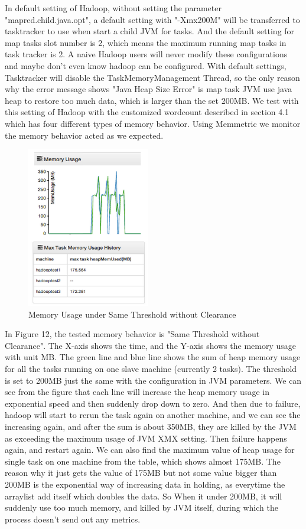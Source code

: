 In default setting of Hadoop, without setting the parameter "mapred.child.java.opt", a default setting with "-Xmx200M" will be transferred to tasktracker to use when start a child JVM for tasks. And the default setting for map tasks slot number is 2, which means the maximum running map tasks in task tracker is 2. A naive Hadoop users will never modify these configurations and maybe don't even know hadoop can be configured.
With default settings, Tasktracker will disable the TaskMemoryManagement Thread, so the only reason why the error message shows "Java Heap Size Error" is map task JVM use java heap to restore too much data, which is larger than the set 200MB.
We test with this setting of Hadoop with the customized wordcount described in section 4.1 which has four different types of memory behavior. Using Memmetric we monitor the memory behavior acted as we expected.

\begin{figure}[ht]
  \centering
    \includegraphics[width=2.1in]{image/test1a.png}
    \caption{Memory Usage under Same Threshold without Clearance}
    \label{ref:memory_allocation}
\end{figure}

In Figure 12, the tested memory behavior is "Same Threshold without Clearance". The X-axis shows the time, and the Y-axis shows the memory usage with unit MB. The green line and blue line shows the sum of heap memory usage for all the tasks running on one slave machine (currently 2 tasks). The threshold is set to 200MB just the same with the configuration in JVM parameters. We can see from the figure that each line will increase the heap memory usage in exponential speed and then suddenly drop down to zero. And then due to failure, hadoop will start to rerun the task again on another machine, and we can see the increasing again, and after the sum is about 350MB, they are killed by the JVM as exceeding the maximum usage of JVM XMX setting. Then failure happens again, and restart again. We can also find the maximum value of heap usage for single task on one machine from the table, which shows almost 175MB. The reason why it just gets the value of 175MB but not some value bigger than 200MB is the exponential way of increasing data in holding, as everytime the arraylist add itself which doubles the data. So When it under 200MB, it will suddenly use too much memory, and killed by JVM itself, during which the process doesn't send out any metrics.

